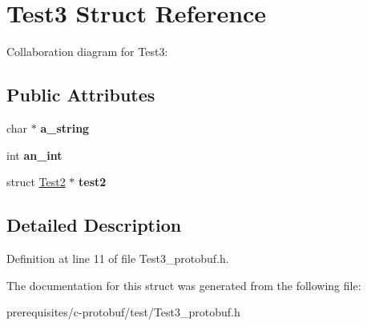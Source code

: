 \hypertarget{struct_test3}{}\section{Test3 Struct Reference}
\label{struct_test3}


Collaboration diagram for Test3\+:
\subsection*{Public Attributes}
\begin{DoxyCompactItemize}
\item 
\mbox{\label{struct_test3_a094f0b880b9ea7de55a415ab7384fb7e}} 
char $\ast$ {\bfseries a\+\_\+string}
\item 
\mbox{\label{struct_test3_a5cc644bd85acf78c9bdac3b4052555d6}} 
int {\bfseries an\+\_\+int}
\item 
\mbox{\label{struct_test3_afb533c68d50b2887cf57fbe05d07c867}} 
struct \mbox{\hyperlink{struct_test2}{Test2}} $\ast$ {\bfseries test2}
\end{DoxyCompactItemize}


\subsection{Detailed Description}


Definition at line 11 of file Test3\+\_\+protobuf.\+h.



The documentation for this struct was generated from the following file\+:\begin{DoxyCompactItemize}
\item 
prerequisites/c-\/protobuf/test/Test3\+\_\+protobuf.\+h\end{DoxyCompactItemize}
